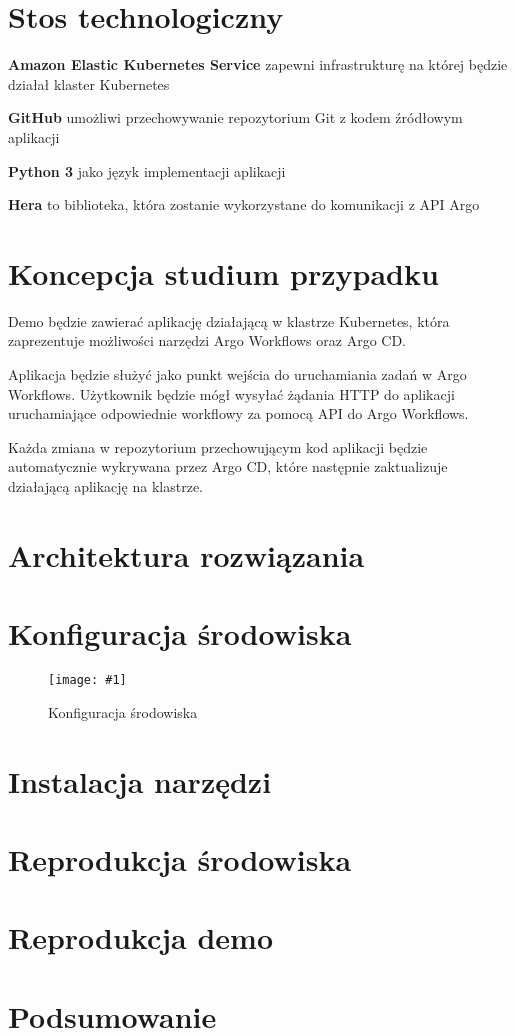 \documentclass{article}
\newcommand{\img}[4]{
    \begin{figure}
    \centering
    \texttt{[image: \#1]}
    \caption{#2}
    \label{#3}
    \end{figure}
}
\begin{document}
\section{Stos technologiczny}
\begin{description}
\item{\textbf{Amazon Elastic Kubernetes Service}\cite{aws-eks}} zapewni infrastrukturę na której będzie działał klaster Kubernetes

\item{\textbf{GitHub}\cite{github}} umożliwi przechowywanie repozytorium Git z kodem źródłowym aplikacji

\item{\textbf{Python 3}\cite{python}} jako język implementacji aplikacji

\item{\textbf{Hera}\cite{hera}} to biblioteka, która zostanie wykorzystane do komunikacji z API Argo
\end{description}


\newpage
\section{Koncepcja studium przypadku}
Demo będzie zawierać aplikację działającą w klastrze Kubernetes, która zaprezentuje możliwości narzędzi Argo Workflows oraz Argo CD.

Aplikacja będzie służyć jako punkt wejścia do uruchamiania zadań w Argo Workflows. Użytkownik będzie mógł wysyłać
żądania HTTP do aplikacji uruchamiające odpowiednie workflowy za pomocą API do Argo Workflows.

Każda zmiana w repozytorium przechowującym kod aplikacji będzie automatycznie wykrywana przez Argo CD, które następnie zaktualizuje działającą aplikację na klastrze.


\newpage
\section{Architektura rozwiązania}


\newpage
\section{Konfiguracja środowiska}

\img{img/suu_env_conf.drawio.png}{Konfiguracja środowiska}{fig:env-conf}{1}


\newpage
\section{Instalacja narzędzi}


\newpage
\section{Reprodukcja środowiska}


\newpage
\section{Reprodukcja demo}


\newpage
\section{Podsumowanie}


\newpage
\nocite{*}
\printbibliography[heading=bibintoc,title={Źródła}]
\end{document}
